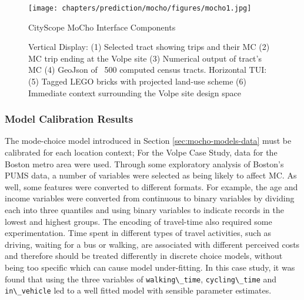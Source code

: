 {{{            \begin{figure}[!htb]
                \centering
                \texttt{[image: chapters/prediction/mocho/figures/mocho1.jpg]}
                \caption{CityScope MoCho Interface Components}\label{fig:mocho_components}
                \caption*{Vertical Display: (1) Selected tract showing trips and their MC (2) MC trip ending at the Volpe site (3) Numerical output of tract's MC (4) GeoJson of ~500 computed census tracts. Horizontal TUI: (5) Tagged LEGO bricks with projected land-use scheme (6) Immediate context surrounding the Volpe site design space}
            \end{figure}

        }

        \subsubsection{Model Calibration Results}
        {
            The mode-choice model introduced in Section \eqref{sec:mocho-models-data} must be calibrated for each location context; For the Volpe Case Study, data for the Boston metro area were used. Through some exploratory analysis of Boston's PUMS data, a number of variables were selected as being likely to affect MC. As well, some features were converted to different formats. For example, the age and income variables were converted from continuous to binary variables by dividing each into three quantiles and using binary variables to indicate records in the lowest and highest groups.
            \newline
            The encoding of travel-time also required some experimentation. Time spent in different types of travel activities, such as driving, waiting for a bus or walking, are associated with different perceived costs and therefore should be treated differently in discrete choice models, without being too specific which can cause model under-fitting. In this case study, it was found that using the three variables of \verb|walking\_time|, \verb|cycling\_time| and \verb|in\_vehicle| led to a well fitted model with sensible parameter estimates.
            \newline
}}}
